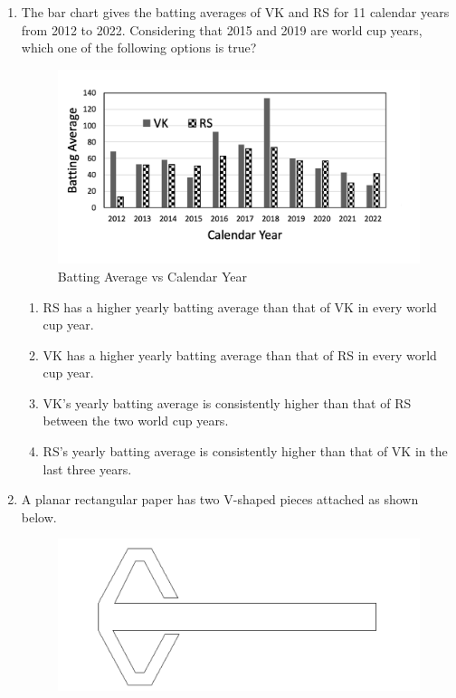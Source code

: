 \documentclass[12pt]{article}
\begin{document}
\begin{enumerate}
\begin{enumerate}
     \item28 
   \item 27 
   \item 18  
   \item 19 
\end{enumerate}


\item The bar chart gives the batting averages of VK and RS for 11 calendar years from
2012 to 2022. Considering that 2015 and 2019 are world cup years, which one of
the following options is true?

\begin{figure}[H]
\centering
\includegraphics[width=0.5\linewidth]{Figs/LatexGraph.png}
\caption{Batting Average vs Calendar Year}
    \end{figure}

\begin{enumerate}
     \item RS has a higher yearly batting average than that of VK in every world cup year.  
   \item VK has a higher yearly batting average than that of RS in every world cup year. 
   \item VK’s yearly batting average is consistently higher than that of RS between the two
world cup years.  
   \item  RS’s yearly batting average is consistently higher than that of VK in the last three
years. 
\end{enumerate}



\item A planar rectangular paper has two V-shaped pieces attached as shown below.
\begin{figure}[H]
\centering
\includegraphics[width=0.5\linewidth]{Figs/LatexImage1.png}
\end{figure}


\end{enumerate}
\end{document}
